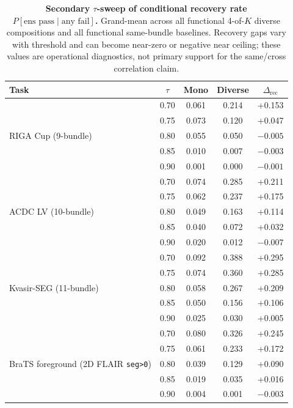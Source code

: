 \begin{table}[!htbp]
  \caption{\textbf{Secondary $\tau$-sweep of conditional recovery rate $P[\text{ens pass}\mid\text{any fail}]$.} Grand-mean across all functional 4-of-$K$ diverse compositions and all functional same-bundle baselines. Recovery gaps vary with threshold and can become near-zero or negative near ceiling; these values are operational diagnostics, not primary support for the same/cross correlation claim.}
  \label{tab:tau-sweep}
  \centering\footnotesize
  \begin{tabular}{l c c c c}
    \toprule
    Task & $\tau$ & Mono & Diverse & $\Delta_{\mathrm{rec}}$ \\
    \midrule
    \multirow{5}{*}{RIGA Cup (9-bundle)}
      & 0.70 & 0.061 & 0.214 & +0.153 \\
      & 0.75 & 0.073 & 0.120 & +0.047 \\
      & 0.80 & 0.055 & 0.050 & $-0.005$ \\
      & 0.85 & 0.010 & 0.007 & $-0.003$ \\
      & 0.90 & 0.001 & 0.000 & $-0.001$ \\
    \midrule
    \multirow{5}{*}{ACDC LV (10-bundle)}
      & 0.70 & 0.074 & 0.285 & +0.211 \\
      & 0.75 & 0.062 & 0.237 & +0.175 \\
      & 0.80 & 0.049 & 0.163 & +0.114 \\
      & 0.85 & 0.040 & 0.072 & +0.032 \\
      & 0.90 & 0.020 & 0.012 & $-0.007$ \\
    \midrule
    \multirow{5}{*}{Kvasir-SEG (11-bundle)}
      & 0.70 & 0.092 & 0.388 & +0.295 \\
      & 0.75 & 0.074 & 0.360 & +0.285 \\
      & 0.80 & 0.058 & 0.267 & +0.209 \\
      & 0.85 & 0.050 & 0.156 & +0.106 \\
      & 0.90 & 0.025 & 0.030 & +0.005 \\
    \midrule
    \multirow{5}{*}{BraTS foreground (2D FLAIR \texttt{seg>0})}
      & 0.70 & 0.080 & 0.326 & +0.245 \\
      & 0.75 & 0.061 & 0.233 & +0.172 \\
      & 0.80 & 0.039 & 0.129 & +0.090 \\
      & 0.85 & 0.019 & 0.035 & +0.016 \\
      & 0.90 & 0.004 & 0.001 & $-0.003$ \\
    \bottomrule
  \end{tabular}
\end{table}

